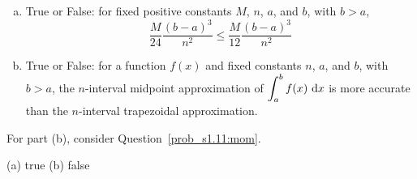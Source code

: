 \begin{question}
\begin{enumerate}[(a)]
\item True or False: for fixed positive constants $M$, $n$, $a$, and $b$, with $b>a$,\[\dfrac{M}{24}\dfrac{(b-a)^3}{n^2}\leq \dfrac{M}{12}\dfrac{(b-a)^3}{n^2}\]
\item True or False: for a function $f(x)$ and fixed constants $n$, $a$, and $b$, with $b>a$, the $n$-interval midpoint approximation of $\displaystyle\int_a^b f(x)~\mathrm{d}x$ is more accurate than the $n$-interval trapezoidal approximation.
\end{enumerate}
\end{question}
\begin{hint}
For part (b), consider Question~\ref{prob_s1.11:mom}.
\end{hint}
\begin{answer}
(a) true \qquad (b) false
\end{answer}
